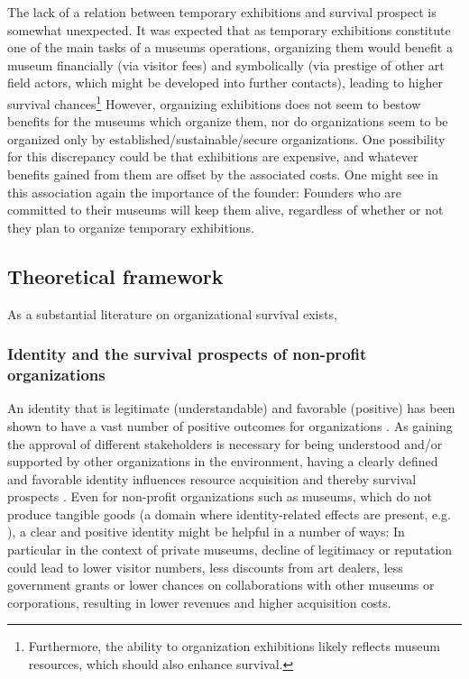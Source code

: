 \documentclass[12pt]{article}
\begin{document}
The lack of a relation between temporary exhibitions and survival prospect is somewhat unexpected.
It was expected that as temporary exhibitions constitute one of the main tasks of a museums operations, organizing them would benefit a museum financially (via visitor fees) and symbolically (via prestige of other art field actors, which might be developed into further contacts), leading to higher survival chances\footnote{Furthermore, the ability to organization exhibitions likely reflects museum resources, which should also enhance survival.}
However, organizing exhibitions does not seem to bestow benefits for the museums which organize them, nor do organizations seem to be organized only by established/sustainable/secure organizations.
One possibility for this discrepancy could be that exhibitions are expensive, and whatever benefits gained from them are offset by the associated costs.
One might see in this association again the importance of the founder:
Founders who are committed to their museums will keep them alive, regardless of whether or not they plan to organize temporary exhibitions.








\subsection*{Theoretical framework}


As a substantial literature on organizational survival exists, 


\subsubsection*{Identity and the survival prospects of non-profit organizations}

An identity that is legitimate (understandable) and favorable (positive) has been shown to have a vast number of positive outcomes for organizations \parencite{Lange_Lee_Dai_2010_reputation}.
As gaining the approval of different stakeholders is necessary for being understood and/or supported by other organizations in the environment, having a clearly defined and favorable identity influences resource acquisition and thereby survival prospects \parencite{Rao_1994_reputation}.
Even for non-profit organizations such as museums, which do not produce tangible goods (a domain where identity-related effects are present, e.g. \cite{Hsu_2015_granted,Bogaert_etal_2014_ecological}), a clear and positive identity might be helpful in a number of ways:
In particular in the context of private museums, decline of legitimacy or reputation could lead to lower visitor numbers, less discounts from art dealers, less government grants or lower chances on collaborations with other museums or corporations, resulting in lower revenues and higher acquisition costs.
\end{document}
